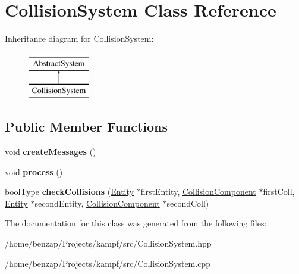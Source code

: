 \hypertarget{classCollisionSystem}{\section{Collision\-System Class Reference}
\label{classCollisionSystem}
}
Inheritance diagram for Collision\-System\-:\begin{figure}[H]
\begin{center}
\leavevmode
\includegraphics[height=2.000000cm]{classCollisionSystem}
\end{center}
\end{figure}
\subsection*{Public Member Functions}
\begin{DoxyCompactItemize}
\item 
\hypertarget{classCollisionSystem_a8db29da1a0e29fc07495ee098bbcfeea}{void {\bfseries create\-Messages} ()}\label{classCollisionSystem_a8db29da1a0e29fc07495ee098bbcfeea}

\item 
\hypertarget{classCollisionSystem_ac0b8af9e2bc109b63a71e696c9320cce}{void {\bfseries process} ()}\label{classCollisionSystem_ac0b8af9e2bc109b63a71e696c9320cce}

\item 
\hypertarget{classCollisionSystem_aaf37445a3bfbb062d08b98d2ff506848}{bool\-Type {\bfseries check\-Collisions} (\hyperlink{classAbstractEntity}{Entity} $\ast$first\-Entity, \hyperlink{classCollisionComponent}{Collision\-Component} $\ast$first\-Coll, \hyperlink{classAbstractEntity}{Entity} $\ast$second\-Entity, \hyperlink{classCollisionComponent}{Collision\-Component} $\ast$second\-Coll)}\label{classCollisionSystem_aaf37445a3bfbb062d08b98d2ff506848}

\end{DoxyCompactItemize}


The documentation for this class was generated from the following files\-:\begin{DoxyCompactItemize}
\item 
/home/benzap/\-Projects/kampf/src/Collision\-System.\-hpp\item 
/home/benzap/\-Projects/kampf/src/Collision\-System.\-cpp\end{DoxyCompactItemize}
